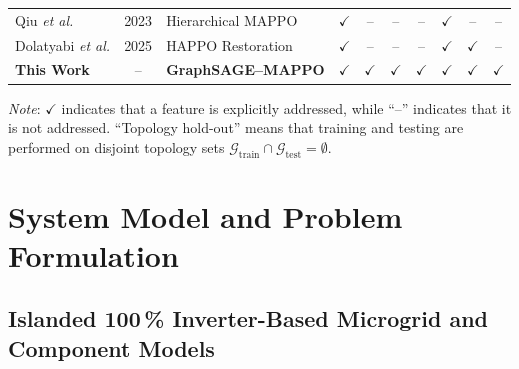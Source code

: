 \documentclass[lettersize,journal]{IEEEtran}
\begin{document}
\begin{table}[!t]
{\begin{tabular}{l c l c c c c c c c}
Qiu \emph{et al.} \cite{qiu2023hierarchical}
& 2023
& Hierarchical MAPPO
& $\checkmark$ & -- & --
& -- & $\checkmark$ & --
& --
\\

Dolatyabi \emph{et al.} \cite{dolatyabi2025happo}
& 2025
& HAPPO Restoration
& $\checkmark$ & -- & --
& -- & $\checkmark$ & $\checkmark$
& --
\\

\hline

\textbf{This Work}
& --
& \textbf{GraphSAGE--MAPPO}
& \textbf{$\checkmark$}
& \textbf{$\checkmark$}
& \textbf{$\checkmark$}
& \textbf{$\checkmark$}
& \textbf{$\checkmark$}
& \textbf{$\checkmark$}
& \textbf{$\checkmark$}
\\

\hline
\end{tabular}

} %

\vspace{0.4em}

\begin{minipage}{0.94\linewidth}
\footnotesize
\textit{Note}: $\checkmark$ indicates that a feature is explicitly addressed, while ``--'' indicates that it is not addressed. ``Topology hold-out'' means that training and testing are performed on
disjoint topology sets
$\mathcal{G}_{\mathrm{train}}
\cap
\mathcal{G}_{\mathrm{test}}
=
\emptyset$.
\end{minipage}

\end{table}


\section{System Model and Problem Formulation}
\label{sec:model}
\subsection{Islanded 100\,\% Inverter-Based Microgrid and Component Models}
\label{sec:model:overview}
\end{document}
